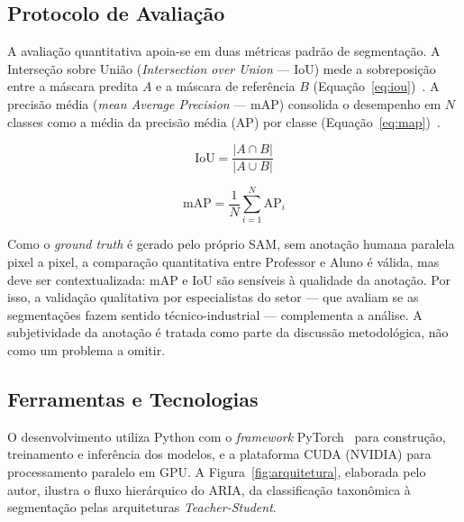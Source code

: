 \documentclass[12pt]{article}
\begin{document}
\subsection{Protocolo de Avaliação}

A avaliação quantitativa apoia-se em duas métricas padrão de segmentação. A Interseção sobre União (\textit{Intersection over Union} --- IoU) mede a sobreposição entre a máscara predita $A$ e a máscara de referência $B$ (Equação~\ref{eq:iou})~\cite{iou_mahmood2021}. A precisão média (\textit{mean Average Precision} --- mAP) consolida o desempenho em $N$ classes como a média da precisão média ($\mathrm{AP}$) por classe (Equação~\ref{eq:map})~\cite{voc_everingham2010}.

\begin{equation}
  \mathrm{IoU} = \frac{|A \cap B|}{|A \cup B|}
  \label{eq:iou}
\end{equation}

\begin{equation}
  \mathrm{mAP} = \frac{1}{N} \sum_{i=1}^{N} \mathrm{AP}_i
  \label{eq:map}
\end{equation}

Como o \textit{ground truth} é gerado pelo próprio SAM, sem anotação humana paralela pixel a pixel, a comparação quantitativa entre Professor e Aluno é válida, mas deve ser contextualizada: mAP e IoU são sensíveis à qualidade da anotação. Por isso, a validação qualitativa por especialistas do setor --- que avaliam se as segmentações fazem sentido técnico-industrial --- complementa a análise. A subjetividade da anotação é tratada como parte da discussão metodológica, não como um problema a omitir.

\subsection{Ferramentas e Tecnologias}

O desenvolvimento utiliza Python com o \textit{framework} PyTorch~\cite{pytorch_paszke2019} para construção, treinamento e inferência dos modelos, e a plataforma CUDA (NVIDIA) para processamento paralelo em GPU. A Figura~\ref{fig:arquitetura}, elaborada pelo autor, ilustra o fluxo hierárquico do ARIA, da classificação taxonômica à segmentação pelas arquiteturas \textit{Teacher-Student}.
\end{document}
